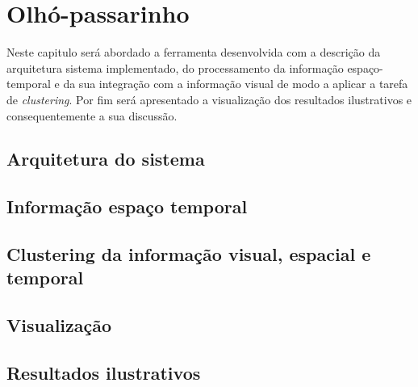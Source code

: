 \chapter{Olhó-passarinho}\label{chap:chap4}

Neste capitulo será abordado a ferramenta desenvolvida com a descrição da arquitetura sistema implementado, do processamento da informação espaço-temporal e da sua integração com a informação visual de modo a aplicar a tarefa de \textit{clustering}. Por fim será apresentado a visualização dos resultados ilustrativos e consequentemente a sua discussão. 

\section{Arquitetura do sistema}



\section{Informação espaço temporal}

\section{Clustering da informação visual, espacial e temporal}

\section{Visualização}

\section{Resultados ilustrativos}